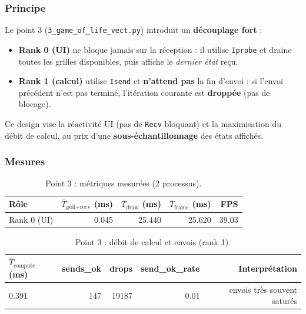 \documentclass[11pt,a4paper]{article}
\begin{document}
\subsubsection{Principe}

Le point 3 (\texttt{3\_game\_of\_life\_vect.py}) introduit un \textbf{découplage fort} :
\begin{itemize}[leftmargin=1.2em]
  \item \textbf{Rank 0 (UI)} ne bloque jamais sur la réception : il utilise \texttt{Iprobe} et draine toutes les grilles disponibles,
        puis affiche le \emph{dernier état} reçu.
  \item \textbf{Rank 1 (calcul)} utilise \texttt{Isend} et \textbf{n’attend pas} la fin d’envoi : si l’envoi précédent n’est pas terminé,
        l’itération courante est \textbf{droppée} (pas de blocage).
\end{itemize}

Ce design vise la réactivité UI (pas de \texttt{Recv} bloquant) et la maximisation du débit de calcul, au prix d’une \textbf{sous-échantillonnage} des états affichés.

\subsubsection{Mesures}

\begin{table}[H]
  \centering
  \small
  \caption{Point 3 : métriques mesurées (2 processus).}
  \label{tab:p3-raw}
  \begin{tabular}{@{}lrrrr@{}}
    \toprule
    Rôle & $\overline{T}_{\text{poll+recv}}$ (ms) & $\overline{T}_{\text{draw}}$ (ms) & $\overline{T}_{\text{frame}}$ (ms) & FPS \\
    \midrule
    Rank 0 (UI) & 0.045 & 25.440 & 25.620 & 39.03 \\
    \bottomrule
  \end{tabular}
\end{table}

\begin{table}[H]
  \centering
  \small
  \caption{Point 3 : débit de calcul et envois (rank 1).}
  \label{tab:p3-calc}
  \begin{tabular}{@{}lrrrr@{}}
    \toprule
    $\overline{T}_{\text{compute}}$ (ms) & sends\_ok & drops & send\_ok\_rate & Interprétation \\
    \midrule
    0.391 & 147 & 19187 & 0.01 & envois très souvent saturés \\
    \bottomrule
  \end{tabular}
\end{table}
\end{document}
